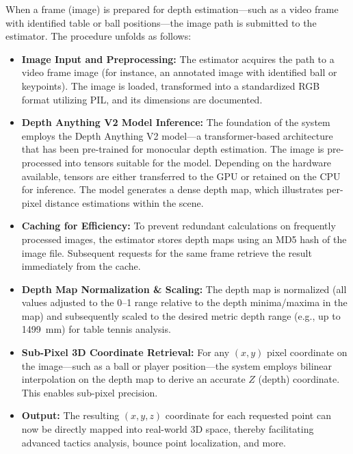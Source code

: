 \documentclass[conference]{IEEEtran}
\begin{document}
When a frame (image) is prepared for depth estimation---such as a video frame with identified table or ball positions---the image path is submitted to the estimator. The procedure unfolds as follows:

\begin{itemize}
    \item \textbf{Image Input and Preprocessing:} 
    The estimator acquires the path to a video frame image (for instance, an annotated image with identified ball or keypoints). The image is loaded, transformed into a standardized RGB format utilizing PIL, and its dimensions are documented.
    
    \item \textbf{Depth Anything V2 Model Inference:}
    The foundation of the system employs the Depth Anything V2 model---a transformer-based architecture that has been pre-trained for monocular depth estimation. The image is pre-processed into tensors suitable for the model. Depending on the hardware available, tensors are either transferred to the GPU or retained on the CPU for inference. The model generates a dense depth map, which illustrates per-pixel distance estimations within the scene.
    
    \item \textbf{Caching for Efficiency:}
    To prevent redundant calculations on frequently processed images, the estimator stores depth maps using an MD5 hash of the image file. Subsequent requests for the same frame retrieve the result immediately from the cache.

    \item \textbf{Depth Map Normalization \& Scaling:}
    The depth map is normalized (all values adjusted to the 0--1 range relative to the depth minima/maxima in the map) and subsequently scaled to the desired metric depth range (e.g., up to 1499~mm) for table tennis analysis.

    \item \textbf{Sub-Pixel 3D Coordinate Retrieval:}
    For any $(x, y)$ pixel coordinate on the image---such as a ball or player position---the system employs bilinear interpolation on the depth map to derive an accurate $Z$ (depth) coordinate. This enables sub-pixel precision.

    \item \textbf{Output:}
    The resulting $(x, y, z)$ coordinate for each requested point can now be directly mapped into real-world 3D space, thereby facilitating advanced tactics analysis, bounce point localization, and more.
\end{itemize}
\end{document}
